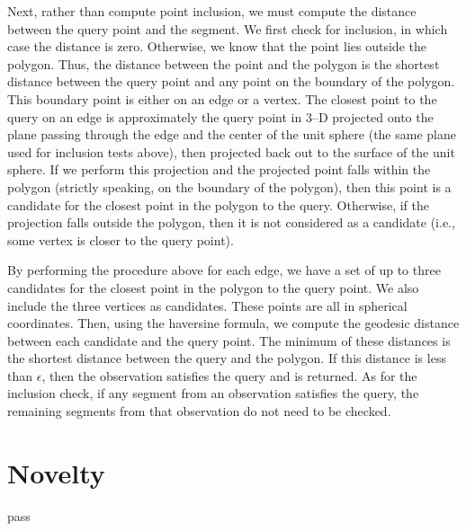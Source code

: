 \documentclass[twocolumn]{extarticle}
\begin{document}
Next, rather than compute point inclusion, we must compute the distance between
the query point and the segment. We first check for inclusion, in which case
the distance is zero. Otherwise, we know that the point lies outside the
polygon. Thus, the distance between the point and the polygon is the shortest
distance between the query point and any point on the boundary of the polygon.
This boundary point is either on an edge or a vertex. The closest point to the
query on an edge is approximately the query point in 3--D projected onto the
plane passing through the edge and the center of the unit sphere (the same plane
used for inclusion tests above), then projected back out to the surface of the
unit sphere. If we perform this projection and the projected point falls within
the polygon (strictly speaking, on the boundary of the polygon), then this point
is a candidate for the closest point in the polygon to the query. Otherwise, if
the projection falls outside the polygon, then it is not considered as a
candidate (i.e., some vertex is closer to the query point).

By performing the procedure above for each edge, we have a set of up to three
candidates for the closest point in the polygon to the query point. We also
include the three vertices as candidates. These points are all in spherical
coordinates. Then, using the haversine formula, we compute the geodesic distance
between each candidate and the query point. The minimum of these distances is
the shortest distance between the query and the polygon. If this distance is
less than $\epsilon$, then the observation satisfies the query and is returned.
As for the inclusion check, if any segment from an observation satisfies the
query, the remaining segments from that observation do not need to be checked.

\section*{Novelty}
pass



\end{document}
